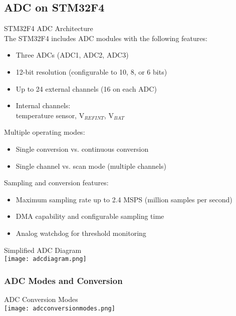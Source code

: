 \subsection{ADC on STM32F4}

\begin{concept}{STM32F4 ADC Architecture}\\
The STM32F4 includes ADC modules with the following features:
\begin{itemize}
    \item Three ADCs (ADC1, ADC2, ADC3)
    \item 12-bit resolution (configurable to 10, 8, or 6 bits)
    \item Up to 24 external channels (16 on each ADC)
    \item Internal channels: \\ temperature sensor, V$_{REFINT}$, V$_{BAT}$
\end{itemize}
 Multiple operating modes:
    \begin{itemize}
        \item Single conversion vs. continuous conversion
        \item Single channel vs. scan mode (multiple channels)
    \end{itemize}
Sampling and conversion features:
\begin{itemize}
    \item Maximum sampling rate up to 2.4 MSPS (million samples per second)
    \item DMA capability and configurable sampling time
    \item Analog watchdog for threshold monitoring
\end{itemize}
\end{concept}


\begin{theorem}{Simplified ADC Diagram}\\
    \texttt{[image: adcdiagram.png]}
\end{theorem}

\subsubsection{ADC Modes and Conversion}

\begin{definition}{ADC Conversion Modes}\\
    \texttt{[image: adcconversionmodes.png]}
\end{definition}





